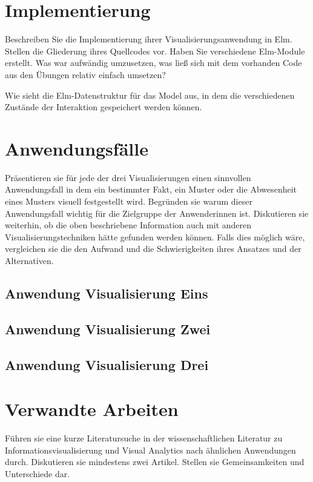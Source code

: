 \documentclass[usegeometry=true]{scrartcl}
\begin{document}
\section{Implementierung}
Beschreiben Sie die Implementierung ihrer Visualisierungsanwendung in Elm. Stellen die Gliederung ihres Quellcodes vor.
 Haben Sie verschiedene Elm-Module erstellt. Was war aufwändig umzusetzen, 
 was ließ sich mit dem vorhanden Code aus den Übungen relativ einfach umsetzen? 

Wie sieht die Elm-Datenstruktur für das Model aus, in dem die verschiedenen Zustände der Interaktion gespeichert werden können.

\section{Anwendungsfälle}
Präsentieren sie für jede der drei Visualisierungen einen sinnvollen Anwendungsfall 
in dem ein bestimmter Fakt, ein Muster oder die Abwesenheit eines Musters visuell festgestellt wird.
Begründen sie warum dieser Anwendungsfall wichtig für die Zielgruppe der Anwenderinnen ist.
Diskutieren sie weiterhin, ob die oben beschriebene Information auch mit anderen 
Visualisierungstechniken hätte gefunden werden können.
Falls dies möglich wäre, vergleichen sie die den Aufwand und die Schwierigkeiten ihres Ansatzes und der Alternativen. 
\subsection{Anwendung Visualisierung Eins}

\subsection{Anwendung Visualisierung Zwei}



\subsection{Anwendung Visualisierung Drei}

\section{Verwandte Arbeiten}
Führen sie eine kurze Literatursuche in der wissenschaftlichen Literatur zu Informationsvisualisierung und Visual Analytics nach ähnlichen Anwendungen durch. Diskutieren sie mindestens zwei Artikel. Stellen sie Gemeinsamkeiten und Unterschiede dar.
\end{document}
